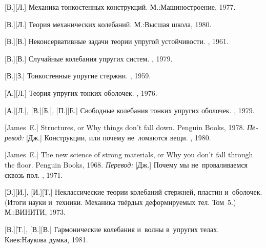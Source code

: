 \begin{thebibliography}{123}
\begin{otherlanguage}{russian}
[В.][Л.] Механика тонкостенных конструкций. М.:\;Машино\-строение, 1977. 

[В.][Л.] Теория механических колебаний. М.:\;Высшая школа, 1980. 

[В.][В.] Неконсервативные задачи теории упругой устойчивости. \fizmatgiz, 1961. 

[В.][В.] Случайные колебания упругих систем. \naukapublisher, 1979. 

[В.][З.] Тонкостенные упругие стержни. \fizmatgiz, 1959. 

[А.][Л.] Теория упругих тонких оболочек. \naukapublisher, 1976. 

[А.][Л.], [В.][Б.], [П.][Е.] Свободные ко\-леба\-ния тонких упругих оболочек. \naukapublisher, 1979. 

[James~E.] Structures, or Why things don’t fall down. Penguin Books, 1978. 
\emph{Перевод:} [Дж.] Конструкции, или почему не~ломаются вещи. \mirpublisher, 1980. 

[James~E.] The new science of strong materials, or Why you don’t fall through the floor. Penguin Books, 1968. 
\emph{Перевод:} [Дж.] Почему мы не~проваливаемся сквозь пол. \mirpublisher, 1971. 

[Э.][И.], [И.][Т.] Неклассические теории колебаний стержней, пластин и~оболочек. (Итоги науки и~техники. Механика твёрдых деформируемых тел. Том~5.) М.:\;ВИНИТИ, 1973. 

[В.][Т.], [В.][В.] Гармонические колебания и~волны в~упругих телах. Киев:\;Наукова думка, 1981. 



\end{otherlanguage}
\end{thebibliography}

